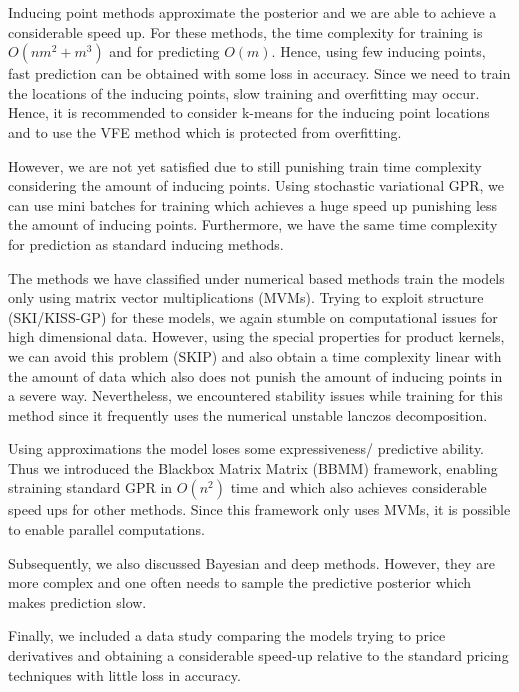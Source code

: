 \documentclass[12pt,a4paper,oneside]{book}
\begin{document}
Inducing point methods approximate the posterior and we are able to achieve a considerable speed up. For these methods, the time complexity for training is $O(nm^2 + m^3)$ and for predicting $O(m)$. Hence, using few inducing points, fast prediction can be obtained with some loss in accuracy. Since we need to train the locations of the inducing points, slow training and overfitting may occur. Hence, it is recommended to consider k-means for the inducing point locations and to use the VFE method which is protected from overfitting.  

However, we are not yet satisfied due to still punishing train time complexity considering the amount of inducing points. Using stochastic variational GPR, we can use mini batches for training which achieves a huge speed up punishing less the amount of inducing points. Furthermore, we have the same time complexity for prediction as standard inducing methods. 

The methods we have classified under numerical based methods train the models only using matrix vector multiplications (MVMs). Trying to exploit structure (SKI/KISS-GP) for these models, we again stumble on computational issues for high dimensional data. However, using the special properties for product kernels, we can avoid this problem (SKIP) and also obtain a time complexity linear with the amount of data which also does not punish the amount of inducing points in a severe way. Nevertheless,  we encountered stability issues while training for this method since it frequently uses the numerical unstable lanczos decomposition. 

Using approximations the model loses some expressiveness/ predictive ability. Thus we introduced the Blackbox Matrix Matrix (BBMM) framework, enabling straining standard GPR in $O(n^2)$ time and which also achieves considerable speed ups for other methods. Since this framework only uses MVMs, it is possible to enable parallel computations. 


Subsequently, we also discussed Bayesian and deep methods. However, they are more complex and one often needs to sample the predictive posterior which makes prediction slow. 

Finally, we included a data study comparing the models trying to price derivatives and obtaining a considerable speed-up relative to the standard pricing techniques with little loss in accuracy. 
\end{document}
